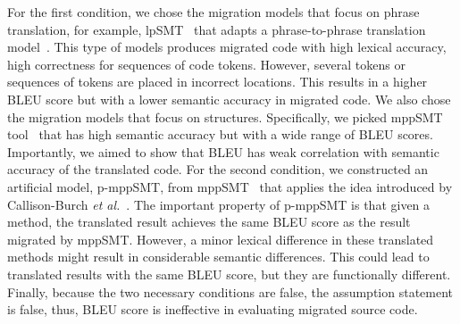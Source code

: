For the first condition, we chose the migration models that focus on
phrase translation, for example, lpSMT~\cite{fse13-nier} that adapts a
phrase-to-phrase translation model~\cite{phrasal10}. This type of
models produces migrated code with high lexical accuracy, \ie high
correctness for sequences of code tokens. However, several tokens or
sequences of tokens are placed in incorrect locations.  This results
in a higher BLEU score but with a lower semantic accuracy in migrated
code. We also chose the migration models that focus on
structures. Specifically, we picked mppSMT tool~\cite{ase15} that has
high semantic accuracy but with a wide range of BLEU
scores. Importantly, we aimed to show that BLEU has weak correlation
with semantic accuracy of the translated code.
%
For the second condition, we constructed an artificial model, p-mppSMT, from
mppSMT~\cite{ase15} that applies the idea introduced by Callison-Burch
{\em et al.}~\cite{Callison}. The important property of p-mppSMT is
that given a method, the translated result achieves the same BLEU
score as the result migrated by mppSMT. However, a minor lexical
difference in these translated methods might result in considerable
semantic differences. This could lead to translated results with the
same BLEU score, but they are functionally different.
%
Finally, because the two necessary conditions are false,
the assumption statement is false, thus, BLEU score is ineffective in
evaluating migrated source code.

%
%

